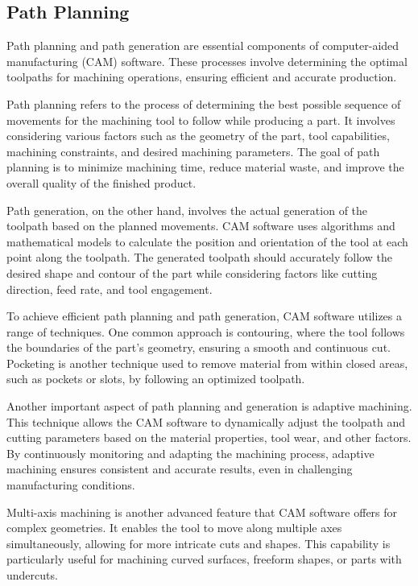 \subsection{Path Planning}
Path planning and path generation are essential components of computer-aided manufacturing (CAM) software. These processes involve determining the optimal toolpaths for machining operations, ensuring efficient and accurate production.

Path planning refers to the process of determining the best possible sequence of movements for the machining tool to follow while producing a part. It involves considering various factors such as the geometry of the part, tool capabilities, machining constraints, and desired machining parameters. The goal of path planning is to minimize machining time, reduce material waste, and improve the overall quality of the finished product.

Path generation, on the other hand, involves the actual generation of the toolpath based on the planned movements. CAM software uses algorithms and mathematical models to calculate the position and orientation of the tool at each point along the toolpath. The generated toolpath should accurately follow the desired shape and contour of the part while considering factors like cutting direction, feed rate, and tool engagement.

To achieve efficient path planning and path generation, CAM software utilizes a range of techniques. One common approach is contouring, where the tool follows the boundaries of the part's geometry, ensuring a smooth and continuous cut. Pocketing is another technique used to remove material from within closed areas, such as pockets or slots, by following an optimized toolpath.

Another important aspect of path planning and generation is adaptive machining. This technique allows the CAM software to dynamically adjust the toolpath and cutting parameters based on the material properties, tool wear, and other factors. By continuously monitoring and adapting the machining process, adaptive machining ensures consistent and accurate results, even in challenging manufacturing conditions.

Multi-axis machining is another advanced feature that CAM software offers for complex geometries. It enables the tool to move along multiple axes simultaneously, allowing for more intricate cuts and shapes. This capability is particularly useful for machining curved surfaces, freeform shapes, or parts with undercuts.

